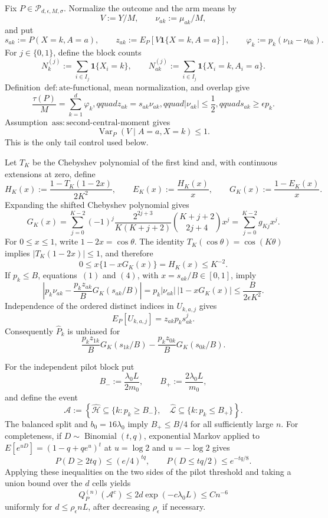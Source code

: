 Fix \(P\in\mathcal P_{d,\epsilon,M,\sigma}\).  Normalize the outcome and the arm means by
\[
 V:=Y/M,\qquad \nu_{ak}:=\mu_{ak}/M,
\]
and put
\[
 s_{ak}:=P(X=k,A=a),\qquad
 z_{ak}:=E_P[V\mathbf 1\{X=k,A=a\}],\qquad
 \varphi_k:=p_k(\nu_{1k}-\nu_{0k}).
\]
For \(j\in\{0,1\}\), define the block counts
\[
 N_k^{(j)}:=\sum_{i\in I_j}\mathbf 1\{X_i=k\},
 \qquad
 N_{ak}^{(j)}:=\sum_{i\in I_j}\mathbf 1\{X_i=k,A_i=a\}.
\]
Definition~\(\mathrm{def:ate\text{-}functional}\), mean normalization, and overlap give
\[
 \frac{\tau(P)}M=\sum_{k=1}^d\varphi_k,qquad
 z_{ak}=s_{ak}\nu_{ak},qquad
 |\nu_{ak}|\le\frac12,qquad
 s_{ak}\ge\epsilon p_k.
\tag{1}
\]
Assumption~\(\mathrm{ass:second\text{-}central\text{-}moment}\) gives
\[
 \operatorname{Var}_P(V\mid A=a,X=k)\le1.
\tag{2}
\]
This is the only tail control used below.

Let \(T_K\) be the Chebyshev polynomial of the first kind and, with continuous extensions at zero, define
\[
 H_K(x):=\frac{1-T_K(1-2x)}{2K^2},\qquad
 E_K(x):=\frac{H_K(x)}x,\qquad
 G_K(x):=\frac{1-E_K(x)}x.
\]
Expanding the shifted Chebyshev polynomial gives
\[
 G_K(x)=\sum_{j=0}^{K-2}(-1)^j
 \frac{2^{2j+3}}{K(K+j+2)}\binom{K+j+2}{2j+4}x^j
 =\sum_{j=0}^{K-2}g_{Kj}x^j.
\tag{3}
\]
For \(0\le x\le1\), write \(1-2x=\cos\theta\).  The identity \(T_K(\cos\theta)=\cos(K\theta)\) implies \(|T_K(1-2x)|\le1\), and therefore
\[
 0\le x\{1-xG_K(x)\}=H_K(x)\le K^{-2}.
\tag{4}
\]
If \(p_k\le B\), equations~\((1)\) and \((4)\), with \(x=s_{ak}/B\in[0,1]\), imply
\[
 \left|p_k\nu_{ak}-\frac{p_kz_{ak}}B G_K(s_{ak}/B)\right|
 =p_k|\nu_{ak}|\,|1-xG_K(x)|
 \le\frac{B}{2\epsilon K^2}.
\tag{5}
\]
Independence of the ordered distinct indices in \(U_{k,a,j}\) gives
\[
 E_P[U_{k,a,j}]=z_{ak}p_ks_{ak}^{j}.
\]
Consequently \(\widehat P_k\) is unbiased for
\[
 \frac{p_kz_{1k}}B G_K(s_{1k}/B)-
 \frac{p_kz_{0k}}B G_K(s_{0k}/B).
\tag{6}
\]

For the independent pilot block put
\[
 B_-:=\frac{\lambda_0L}{2m_0},\qquad
 B_+:=\frac{2\lambda_0L}{m_0},
\]
and define the event
\[
 \mathcal A:=\left\{
 \widehat{\mathcal H}\subseteq\{k:p_k\ge B_-\},\quad
 \widehat{\mathcal L}\subseteq\{k:p_k\le B_+\}
 \right\}.
\]
The balanced split and \(b_0=16\lambda_0\) imply \(B_+\le B/4\) for all sufficiently large \(n\).  For completeness, if \(D\sim\operatorname{Binomial}(t,q)\), exponential Markov applied to \(E[e^{uD}]=(1-q+qe^u)^t\) at \(u=\log2\) and \(u=-\log2\) gives
\[
 P(D\ge2tq)\le(e/4)^{tq},
 \qquad
 P(D\le tq/2)\le e^{-tq/8}.
\]
Applying these inequalities on the two sides of the pilot threshold and taking a union bound over the \(d\) cells yields
\[
 Q_P^{(n)}(\mathcal A^c)
 \le2d\exp(-c\lambda_0L)
 \le Cn^{-6}
\tag{7}
\]
uniformly for \(d\le\rho_{\epsilon}nL\), after decreasing \(\rho_{\epsilon}\) if necessary.

